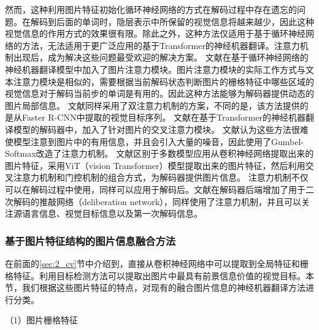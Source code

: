 然而，这种利用图片特征初始化循环神经网络的方式在解码过程中存在遗忘的问题。在解码到后面的单词时，隐层表示中所保留的视觉信息将越来越少，因此这种视觉信息的作用方式的效果很有限。除此之外，这种方法仅适用于基于循环神经网络的方法，无法适用于更广泛应用的基于Transformer的神经机器翻译。注意力机制出现后，成为解决这些问题最受欢迎的解决方案。
文献\cite{36_calixto-etal-2017-doubly,97_gain-etal-2021-iitp,98_laskar-etal-2021-improved,99_DBLP:conf/wmt/CaglayanBBBWMHW18,100_DBLP:journals/corr/CaglayanBB16}在基于循环神经网络的神经机器翻译模型中加入了图片注意力模块。图片注意力模块的实际工作方式与文本注意力模块是相似的，需要根据当前解码状态判断图片的栅格特征中哪些区域的视觉信息对于解码当前步的单词是有用的。因此这种方法能够为解码器提供动态的图片局部信息。
文献\cite{96_zhao-etal-2020-double,101_zhao-etal-2021-tmeku}同样采用了双注意力机制的方案，不同的是，该方法提供的是从Faster R-CNN\cite{DBLP:conf/nips/RenHGS15}中提取的视觉目标序列。
文献\cite{47_DBLP:conf/wmt/LibovickyHM18,102_gronroos-etal-2018-memad,103_DBLP:journals/corr/abs-1807-11605}在基于Transformer的神经机器翻译模型的解码器中，加入了针对图片的交叉注意力模块。
文献\cite{104_DBLP:journals/corr/abs-2103-08862}认为这些方法很难使模型注意到图片中的有用信息，并且会引入大量的噪音，因此使用了Gumbel-Softmax改造了注意力机制。
文献\cite{105_li-etal-2022-vision}区别于多数模型应用从卷积神经网络提取出来的图片特征，采用ViT（vision Transformer）\cite{106_vit,107_swin_transformer}模型提取出来的图片特征，然后利用交叉注意力机制和门控机制的组合方式，为解码器提供图片信息。
注意力机制不仅可以在解码过程中使用，同样可以应用于解码后。文献\cite{39_ive-etal-2019-distilling}在解码器后端增加了用于二次解码的推敲网络（deliberation network），同样使用了注意力机制，并且可以关注源语言信息、视觉目标信息以及第一次解码信息。

\subsubsection{基于图片特征结构的图片信息融合方法}
在前面的\ref{sec:2_cv}节中介绍到，直接从卷积神经网络中可以提取到全局特征和栅格特征。利用目标检测方法可以提取出图片中最具有前景信息价值的视觉目标。本节，我们根据这些图片特征的特点，对现有的融合图片信息的神经机器翻译方法进行分类。

{\sffamily （1）图片栅格特征}


